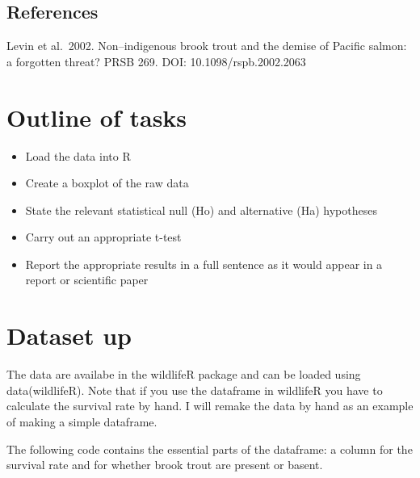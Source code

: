 \documentclass[
]{book}
\providecommand{\tightlist}{%
  \setlength{\itemsep}{0pt}\setlength{\parskip}{0pt}}
\begin{document}
\hypertarget{references-3}{%
\subsection{References}\label{references-3}}

Levin et al.~2002. Non--indigenous brook trout and the demise of Pacific salmon: a forgotten threat? PRSB 269. DOI: 10.1098/rspb.2002.2063

\hypertarget{outline-of-tasks}{%
\section{Outline of tasks}\label{outline-of-tasks}}

\begin{itemize}
\tightlist
\item
  Load the data into R
\item
  Create a boxplot of the raw data
\item
  State the relevant statistical null (Ho) and alternative (Ha) hypotheses
\item
  Carry out an appropriate t-test
\item
  Report the appropriate results in a full sentence as it would appear in a report or scientific paper
\end{itemize}

\hypertarget{dataset-up}{%
\section{Dataset up}\label{dataset-up}}

The data are availabe in the wildlifeR package and can be loaded using data(wildlifeR). Note that if you use the dataframe in wildlifeR you have to calculate the survival rate by hand. I will remake the data by hand as an example of making a simple dataframe.

The following code contains the essential parts of the dataframe: a column for the survival rate and for whether brook trout are present or basent.
\end{document}
